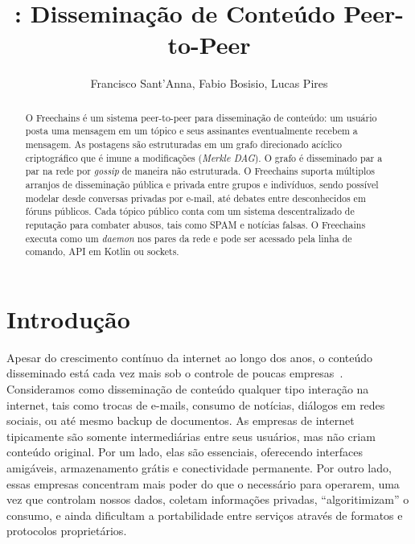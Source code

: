 \documentclass[12pt]{article}
\title{\FC: Disseminação de Conteúdo Peer-to-Peer}
\author {
    Francisco Sant'Anna,
    Fabio Bosisio,
    Lucas Pires
}
\newcommand{\FC} {Freechains\xspace}
\begin{document}
 

\maketitle

\begin{abstract}
O \FC é um sistema peer-to-peer para disseminação de conteúdo: um
usuário posta uma mensagem em um tópico e seus assinantes eventualmente recebem
a mensagem.
As postagens são estruturadas em um grafo direcionado acíclico criptográfico
que é imune a modificações (\emph{Merkle DAG}).
O grafo é disseminado par a par na rede por \emph{gossip} de maneira não
estruturada.
O \FC suporta múltiplos arranjos de disseminação pública e privada entre grupos
e indivíduos, sendo possível modelar desde conversas privadas por e-mail, até
debates entre desconhecidos em fóruns públicos.
Cada tópico público conta com um sistema descentralizado de reputação para
combater abusos, tais como SPAM e notícias falsas.
O \FC executa como um \emph{daemon} nos pares da rede e pode ser acessado pela
linha de comando, API em Kotlin ou sockets.
\end{abstract}
     

\section{Introdução}

Apesar do crescimento contínuo da internet ao longo dos anos, o conteúdo
disseminado está cada vez mais sob o controle de poucas
empresas~\cite{internet.fixing}.
Consideramos como disseminação de conteúdo qualquer tipo interação na internet,
tais como trocas de e-mails, consumo de notícias, diálogos em redes sociais,
ou até mesmo backup de documentos.
%
As empresas de internet tipicamente são somente intermediárias entre seus
usuários, mas não criam conteúdo original.
Por um lado, elas são essenciais, oferecendo interfaces amigáveis,
armazenamento grátis e conectividade permanente.
Por outro lado, essas empresas concentram mais poder do que o necessário para
operarem, uma vez que controlam nossos dados, coletam informações privadas,
``algoritimizam'' o consumo, e ainda dificultam a portabilidade entre serviços
através de formatos e protocolos proprietários.
\end{document}
